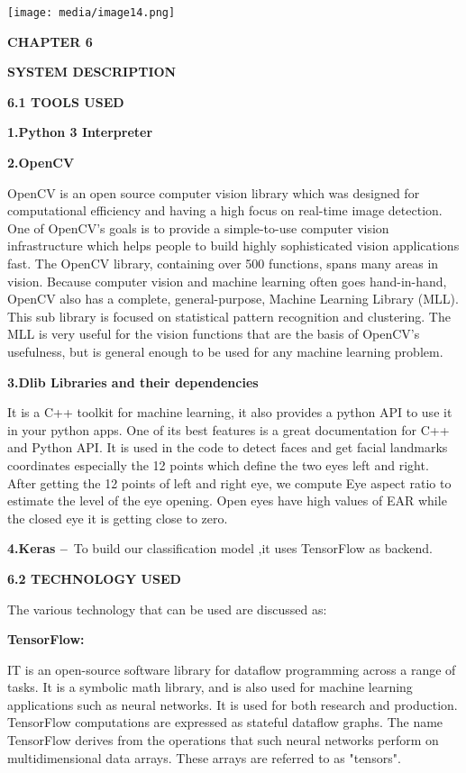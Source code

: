 \documentclass[a4paper,12pt]{article}
\begin{document}
\texttt{[image: media/image14.png]}

\textbf{CHAPTER 6}

\textbf{SYSTEM DESCRIPTION}

\textbf{6.1 TOOLS USED}

\textbf{1.Python 3 Interpreter}

\textbf{2.OpenCV}

OpenCV is an open source computer vision library which was designed for
computational efficiency and having a high focus on real-time image
detection. One of OpenCV's goals is to provide a simple-to-use computer
vision infrastructure which helps people to build highly sophisticated
vision applications fast. The OpenCV library, containing over 500
functions, spans many areas in vision. Because computer vision and
machine learning often goes hand-in-hand, OpenCV also has a complete,
general-purpose, Machine Learning Library (MLL). This sub library is
focused on statistical pattern recognition and clustering. The MLL is
very useful for the vision functions that are the basis of OpenCV's
usefulness, but is general enough to be used for any machine learning
problem.

\textbf{3.Dlib Libraries and their dependencies}

It is a C++ toolkit for machine learning, it also provides a python API
to use it in your python apps. One of its best features is a great
documentation for C++ and Python API. It is used in the code to detect
faces and get facial landmarks coordinates especially the 12 points
which define the two eyes left and right. After getting the 12 points of
left and right eye, we compute Eye aspect ratio to estimate the level of
the eye opening. Open eyes have high values of EAR while the closed eye
it is getting close to zero.

\textbf{4.Keras --}~To build our classification model ,it uses
TensorFlow as backend.

\textbf{6.2 TECHNOLOGY USED}

The various technology that can be used are discussed as:

\textbf{TensorFlow:}

IT is an open-source software library for dataflow programming across a
range of tasks. It is a symbolic math library, and is also used for
machine learning applications such as neural networks. It is used for
both research and production. TensorFlow computations are expressed as
stateful dataflow graphs. The name TensorFlow derives from the
operations that such neural networks perform on multidimensional data
arrays. These arrays are referred to as "tensors".
\end{document}
